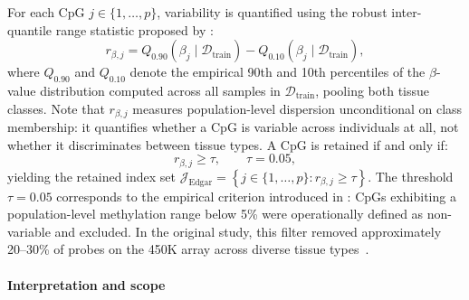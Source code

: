 For each CpG $j \in \{1,\dots,p\}$, variability is quantified 
using the robust inter-quantile range statistic proposed 
by \cite{Edgar2017}:
\begin{equation}
    r_{\beta,j}
    =
    Q_{0.90}\!\left(\beta_{j} \mid 
    \mathcal{D}_{\mathrm{train}}\right)
    -
    Q_{0.10}\!\left(\beta_{j} \mid 
    \mathcal{D}_{\mathrm{train}}\right),
    \label{eq:rbeta}
\end{equation}
where $Q_{0.90}$ and $Q_{0.10}$ denote the empirical 90th 
and 10th percentiles of the $\beta$-value distribution 
computed across all samples in $\mathcal{D}_{\mathrm{train}}$, 
pooling both tissue classes. Note that $r_{\beta,j}$ measures 
population-level dispersion unconditional on class membership: 
it quantifies whether a CpG is variable across individuals 
at all, not whether it discriminates between tissue types.
A CpG is retained if and only if:
\begin{equation}
    r_{\beta,j} \geq \tau, 
    \qquad \tau = 0.05,
    \label{eq:edgar_threshold}
\end{equation}
yielding the retained index set
$    \mathcal{J}_{\mathrm{Edgar}} 
    = 
    \left\{ j \in \{1,\dots,p\} : r_{\beta,j} \geq \tau \right\}.$
The threshold $\tau = 0.05$ corresponds to the empirical 
criterion introduced in \cite{Edgar2017}: CpGs exhibiting 
a population-level methylation range below 5\% were 
operationally defined as non-variable and excluded. 
In the original study, this filter removed approximately 
20--30\% of probes on the 450K array across diverse tissue 
types~\cite{Edgar2017}.

\paragraph{Interpretation and scope}

